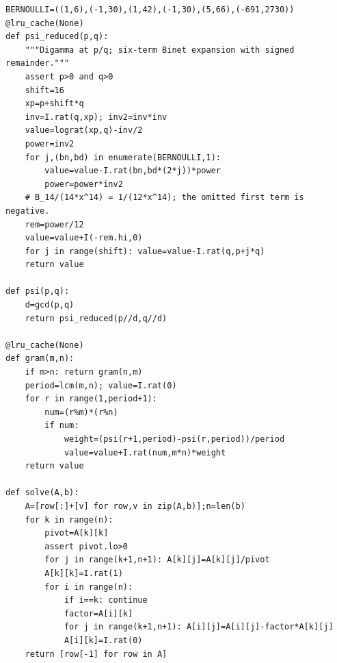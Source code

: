 \documentclass[11pt,a4paper]{article}
\theoremstyle{definition}\newtheorem{definition}[theorem]{Definition}
\theoremstyle{remark}\newtheorem{remark}[theorem]{Remark}
\numberwithin{equation}{section}
\begin{document}
\begin{lstlisting}
BERNOULLI=((1,6),(-1,30),(1,42),(-1,30),(5,66),(-691,2730))
@lru_cache(None)
def psi_reduced(p,q):
    """Digamma at p/q; six-term Binet expansion with signed remainder."""
    assert p>0 and q>0
    shift=16
    xp=p+shift*q
    inv=I.rat(q,xp); inv2=inv*inv
    value=lograt(xp,q)-inv/2
    power=inv2
    for j,(bn,bd) in enumerate(BERNOULLI,1):
        value=value-I.rat(bn,bd*(2*j))*power
        power=power*inv2
    # B_14/(14*x^14) = 1/(12*x^14); the omitted first term is negative.
    rem=power/12
    value=value+I(-rem.hi,0)
    for j in range(shift): value=value-I.rat(q,p+j*q)
    return value

def psi(p,q):
    d=gcd(p,q)
    return psi_reduced(p//d,q//d)

@lru_cache(None)
def gram(m,n):
    if m>n: return gram(n,m)
    period=lcm(m,n); value=I.rat(0)
    for r in range(1,period+1):
        num=(r%m)*(r%n)
        if num:
            weight=(psi(r+1,period)-psi(r,period))/period
            value=value+I.rat(num,m*n)*weight
    return value

def solve(A,b):
    A=[row[:]+[v] for row,v in zip(A,b)];n=len(b)
    for k in range(n):
        pivot=A[k][k]
        assert pivot.lo>0
        for j in range(k+1,n+1): A[k][j]=A[k][j]/pivot
        A[k][k]=I.rat(1)
        for i in range(n):
            if i==k: continue
            factor=A[i][k]
            for j in range(k+1,n+1): A[i][j]=A[i][j]-factor*A[k][j]
            A[i][k]=I.rat(0)
    return [row[-1] for row in A]


\end{lstlisting}
\end{document}
